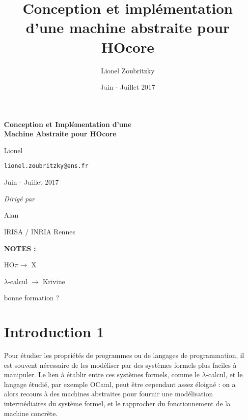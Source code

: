 \documentclass[11pt]{article}
\author{Lionel Zoubritzky}
\date{Juin - Juillet 2017}
\title{Conception et implémentation d'une machine abstraite pour HOcore}
\newcounter{c_theo}
\newcounter{c_def}
\begin{document}
\begin{center}
	
	
	\vspace{0.5cm}
	
	
	\vspace{5cm}
	
	{\LARGE \bf Conception et Implémentation d'une \\ Machine Abstraite pour HOcore}
	
	\vspace{2cm}
	
	Lionel 
	
	\texttt{lionel.zoubritzky@ens.fr}
	
	\vspace{1cm}
	
	Juin - Juillet 2017
	
	
	\vspace{1.5cm}
	
	\textsl{Dirigé par}
	
	Alan 
	
	\vspace{1cm}
	
	IRISA / INRIA Rennes

	\bf	
	NOTES : 

	HO$\pi \to$ X
	
	$\lambda$-calcul $\to$ Krivine
	
	bonne formation ?
	
\end{center}

\clearpage
\tableofcontents
\clearpage


\section{Introduction 1}
\label{sec-1}

Pour étudier les propriétés de programmes ou de langages de programmation, il est souvent nécessaire de les modéliser par des systèmes formels plus faciles à manipuler. 
Le lien à établir entre ces systèmes formels, comme le $\lambda$-calcul, et le langage étudié, par exemple OCaml, peut être cependant assez éloigné : on a alors recours à des machines abstraites pour fournir une modélisation intermédiaires du système formel, et le rapprocher du fonctionnement de la machine concrète.
\end{document}
